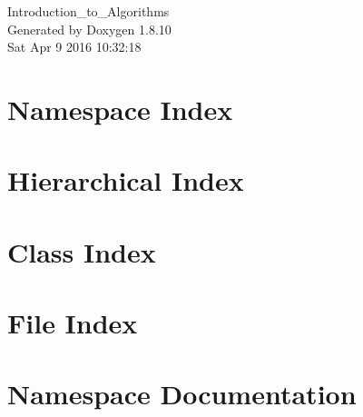 \documentclass[twoside]{book}
\newcommand{\+}{\discretionary{\mbox{\scriptsize$\hookleftarrow$}}{}{}}
\newcommand{\clearemptydoublepage}{%
  \newpage{\pagestyle{empty}\cleardoublepage}%
}
\begin{document}
\hypersetup{pageanchor=false,
             bookmarks=true,
             bookmarksnumbered=true,
             pdfencoding=unicode
            }
\begin{titlepage}
\vspace*{7cm}
\begin{center}%
{\Large Introduction\+\_\+to\+\_\+\+Algorithms }\\
\vspace*{1cm}
{\large Generated by Doxygen 1.8.10}\\
\vspace*{0.5cm}
{\small Sat Apr 9 2016 10:32:18}\\
\end{center}
\end{titlepage}
\clearemptydoublepage
\tableofcontents
\clearemptydoublepage
{}
\hypersetup{pageanchor=true}

\chapter{Namespace Index}

\chapter{Hierarchical Index}

\chapter{Class Index}

\chapter{File Index}

\chapter{Namespace Documentation}








\end{document}
